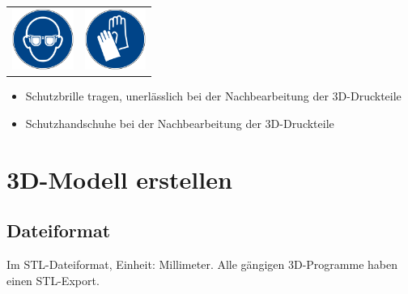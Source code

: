 \documentclass{\basedir/fablab-document}
\begin{document}
\begin{table}[h]
	\centering
	\begin{tabular}{cc}
		
	 \includegraphics[width=2cm]{bilder/gaugenschutz.png}  & \includegraphics[width=2cm]{bilder/ghandschuh.png} \\
	\end{tabular}
\end{table}

\begin{itemize}
	\item Schutzbrille tragen, unerlässlich bei der Nachbearbeitung der 3D-Druckteile \\
	\item Schutzhandschuhe bei der Nachbearbeitung der 3D-Druckteile\\
\end{itemize}
	\newpage

	
	\renewcommand{\contentsname}{Inhaltsverzeichnis / Arbeitsablauf}
	\setcounter{tocdepth}{2}
	\tableofcontents
	\newpage
	
	\section{3D-Modell erstellen}
	
	\subsection{Dateiformat}
	
	Im STL-Dateiformat, Einheit: Millimeter. Alle gängigen 3D-Programme haben einen STL-Export.
	
\end{document}
